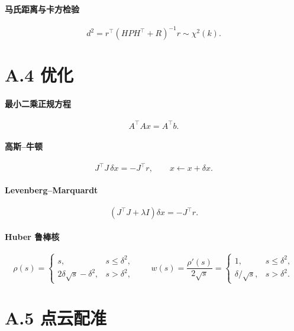 \paragraph{马氏距离与卡方检验}
\begin{equation}
d^{2}=r^{\top}(HPH^{\top}+R)^{-1}r\sim\chi^{2}(k).
\end{equation}

\section*{A.4 优化}

\paragraph{最小二乘正规方程}
\begin{equation}
A^{\top}Ax=A^{\top}b.
\end{equation}

\paragraph{高斯--牛顿}
\begin{equation}
J^{\top}J\,\delta x=-J^{\top}r,\qquad x\leftarrow x+\delta x.
\end{equation}

\paragraph{Levenberg--Marquardt}
\begin{equation}
\left(J^{\top}J+\lambda I\right)\delta x=-J^{\top}r.
\end{equation}

\paragraph{Huber 鲁棒核}
\begin{equation}
\rho(s)=
\begin{cases}
s, & s\le\delta^{2},\\
2\delta\sqrt{s}-\delta^{2}, & s>\delta^{2},
\end{cases}
\qquad
w(s)=\frac{\rho'(s)}{2\sqrt{s}}=
\begin{cases}
1, & s\le\delta^{2},\\
\delta/\sqrt{s}, & s>\delta^{2}.
\end{cases}
\end{equation}

\section*{A.5 点云配准}

